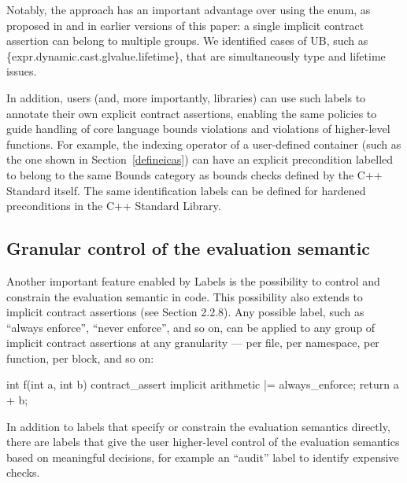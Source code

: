 %
%

Notably, the \cite{P3400R1} approach has an important advantage over using the  enum, as proposed in \cite{P3081R1} and in earlier versions of this paper: a single implicit contract assertion can belong to multiple groups. We identified cases of UB, such as \{expr.dynamic.cast.glvalue.lifetime\}, that are simultaneously type and lifetime issues.

In addition, users (and, more importantly, libraries) can use such labels to annotate their own explicit contract assertions, enabling the same policies to guide handling of core language bounds violations and violations of higher-level functions. For example, the indexing operator of a user-defined container (such as the one shown in Section~\ref{defineicas}) can have an explicit precondition labelled to belong to the same Bounds category as bounds checks defined by the C++ Standard itself. The same identification labels can be defined for hardened preconditions in the C++ Standard Library.

\subsection{Granular control of the evaluation semantic}
\label{semantic}

Another important feature enabled by Labels is the possibility to control and constrain the evaluation semantic in code. This possibility also extends to implicit contract assertions (see \cite{P3400R1} Section 2.2.8). Any possible label, such as ``always enforce'', ``never enforce'', and so on, can be applied to any group of implicit contract assertions at any granularity --- per file, per namespace, per function, per block, and so on:

\begin{codeblock}
int f(int a, int b) {
  contract_assert implicit arithmetic |= always_enforce;
  return a + b;
}
\end{codeblock}

In addition to labels that specify or constrain the evaluation semantics directly, there are labels that give the user higher-level control of the evaluation semantics based on meaningful decisions, for example an ``audit'' label to identify expensive checks.

